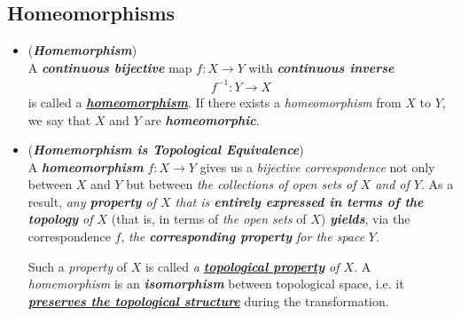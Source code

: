 \documentclass[11pt]{article}
\begin{document}
\subsection{Homeomorphisms}
\begin{itemize}
\item \begin{definition} (\textbf{\emph{Homemorphism}})\\
A \emph{\textbf{continuous bijective}} map $f: X \rightarrow Y$ with \emph{\textbf{continuous inverse}} 
\begin{align*}
f^{-1}: Y \rightarrow X
\end{align*}
is called a \underline{\emph{\textbf{homeomorphism}}}. If there exists a \emph{homeomorphism} from $X$ to $Y$, we say that $X$ and $Y$ are \emph{\textbf{homeomorphic}}.
\end{definition}

\item  \begin{remark} (\emph{\textbf{Homemorphism is Topological Equivalence}})\\
A \emph{\textbf{homeomorphism}} $f : X \rightarrow Y$ gives us a \emph{bijective  correspondence} not only between $X$ and $Y$ but between \emph{the collections of open sets of $X$ and of $Y$}. As a result, \emph{any \textbf{property} of $X$ that is \textbf{entirely expressed in terms of the  topology} of $X$} (that is, in terms of \emph{the open sets} of $X$) \emph{\textbf{yields}}, via the correspondence $f$, \emph{the \textbf{corresponding property} for the space} $Y$. 

Such a \emph{property} of $X$ is called \emph{a \underline{\textbf{topological property}} of $X$}. A \emph{homemorphism} is an \emph{\textbf{isomorphism}} between topological space, i.e. it \underline{\emph{\textbf{preserves the topological structure}}} during the transformation.
\end{remark}


\end{itemize}
\end{document}
